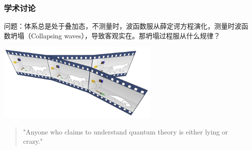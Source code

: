 \begin{frame}
    \frametitle{学术讨论}
    问题：体系总是处于叠加态，不测量时，波函数服从薛定谔方程演化，测量时波函数坍塌（Collapsing waves），导致客观实在。那坍塌过程服从什么规律？\\
    \begin{center}
        \includegraphics[width=0.6\textwidth]{figs/2022-01-17-13-13-18.png} \\
    \end{center} 
    \begin{quote}
    "Anyone who claims to understand quantum theory is either lying or crazy." \\
    \end{quote}
\end{frame}



